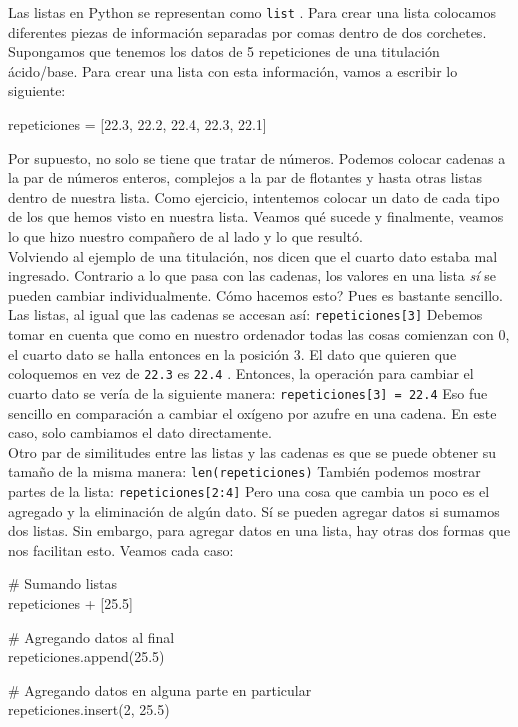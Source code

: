 \documentclass[10pt,letterpaper]{article}
\newcommand{\inlinecode}[1]{
\colorbox{light-gray}{\texttt{#1}}
}
\newenvironment{Code}
{
\begin{lrbox}{\selvestebox}%
\begin{minipage}{\dimexpr\columnwidth-2\fboxsep\relax}
\fontfamily{\ttdefault}\selectfont
}
{\end{minipage}\end{lrbox}%
\begin{center}
\colorbox{light-gray}{\usebox{\selvestebox}}
\end{center}
}
\begin{document}
Las listas en Python se representan como \inlinecode{list}. Para crear una lista colocamos diferentes piezas de informaci\'on separadas por comas dentro de dos corchetes. Supongamos que tenemos los datos de 5 repeticiones de una titulaci\'on \'acido/base. Para crear una lista con esta informaci\'on, vamos a escribir lo siguiente:

\begin{Code}
repeticiones = [22.3, 22.2, 22.4, 22.3, 22.1]
\end{Code}

Por supuesto, no solo se tiene que tratar de n\'umeros. Podemos colocar cadenas a la par de n\'umeros enteros, complejos a la par de flotantes y hasta otras listas dentro de nuestra lista. Como ejercicio, intentemos colocar un dato de cada tipo de los que hemos visto en nuestra lista. Veamos qu\'e sucede y finalmente, veamos lo que hizo nuestro compa\~nero de al lado y lo que result\'o.\\

Volviendo al ejemplo de una titulaci\'on, nos dicen que el cuarto dato estaba mal ingresado. Contrario a lo que pasa con las cadenas, los valores en una lista \emph{s\'i} se pueden cambiar individualmente. C\'omo hacemos esto? Pues es bastante sencillo. Las listas, al igual que las cadenas se accesan as\'i: \inlinecode{repeticiones[3]} Debemos tomar en cuenta que como en nuestro ordenador todas las cosas comienzan con 0, el cuarto dato se halla entonces en la posici\'on 3. El dato que quieren que coloquemos en vez de \inlinecode{22.3} es \inlinecode{22.4}. Entonces, la operaci\'on para cambiar el cuarto dato se ver\'ia de la siguiente manera: \inlinecode{repeticiones[3] = 22.4} Eso fue sencillo en comparaci\'on a cambiar el ox\'igeno por azufre en una cadena. En este caso, solo cambiamos el dato directamente.\\

Otro par de similitudes entre las listas y las cadenas es que se puede obtener su tama\~no de la misma manera: \inlinecode{len(repeticiones)} Tambi\'en podemos mostrar partes de la lista: \inlinecode{repeticiones[2:4]} Pero una cosa que cambia un poco es el agregado y la eliminaci\'on de alg\'un dato. S\'i se pueden agregar datos si sumamos dos listas. Sin embargo, para agregar datos en una lista, hay otras dos formas que nos facilitan esto. Veamos cada caso:

\begin{Code}
\# Sumando listas\\
repeticiones + [25.5]

\# Agregando datos al final\\
repeticiones.append(25.5)

\# Agregando datos en alguna parte en particular\\
repeticiones.insert(2, 25.5)
\end{Code}
\end{document}

